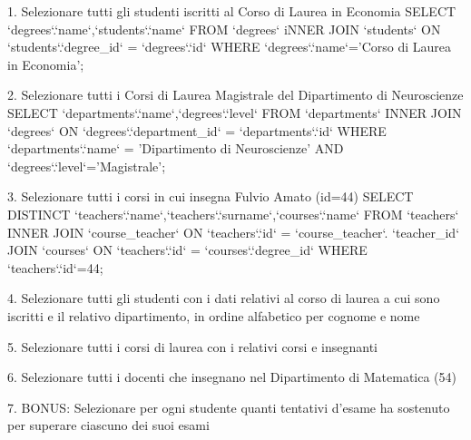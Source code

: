 1. Selezionare tutti gli studenti iscritti al Corso di Laurea in Economia
SELECT `degrees`.`name`,`students`.`name` FROM `degrees` iNNER JOIN `students` ON `students`.`degree_id` = `degrees`.`id` WHERE `degrees`.`name`='Corso di Laurea in Economia';


2. Selezionare tutti i Corsi di Laurea Magistrale del Dipartimento di Neuroscienze
SELECT `departments`.`name`,`degrees`.`level` FROM `departments` INNER JOIN `degrees` ON `degrees`.`department_id` = `departments`.`id` WHERE `departments`.`name` = 'Dipartimento di Neuroscienze' AND `degrees`.`level`='Magistrale';

3. Selezionare tutti i corsi in cui insegna Fulvio Amato (id=44)
SELECT DISTINCT `teachers`.`name`,`teachers`.`surname`,`courses`.`name` FROM `teachers` INNER JOIN `course_teacher` ON `teachers`.`id` = `course_teacher`. `teacher_id` JOIN `courses` ON `teachers`.`id` = `courses`.`degree_id` WHERE `teachers`.`id`=44;

4. Selezionare tutti gli studenti con i dati relativi al corso di laurea a cui sono iscritti e il
relativo dipartimento, in ordine alfabetico per cognome e nome


5. Selezionare tutti i corsi di laurea con i relativi corsi e insegnanti


6. Selezionare tutti i docenti che insegnano nel Dipartimento di Matematica (54)


7. BONUS: Selezionare per ogni studente quanti tentativi d’esame ha sostenuto per
superare ciascuno dei suoi esami